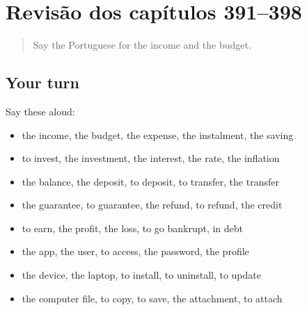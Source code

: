 \section[(dialogue)]{Revisão dos capítulos 391–398}

\label{lesson:PT-R398-revisao-391-398}



\begin{quote}
Say the Portuguese for the income and the budget.
\end{quote}

\subsection*{Your turn}
Say these aloud:

\begin{itemize}
\raggedright
  \item the income, the budget, the expense, the instalment, the saving
  \item to invest, the investment, the interest, the rate, the inflation
  \item the balance, the deposit, to deposit, to transfer, the transfer
  \item the guarantee, to guarantee, the refund, to refund, the credit
  \item to earn, the profit, the loss, to go bankrupt, in debt
  \item the app, the user, to access, the password, the profile
  \item the device, the laptop, to install, to uninstall, to update
  \item the computer file, to copy, to save, the attachment, to attach
\end{itemize}

